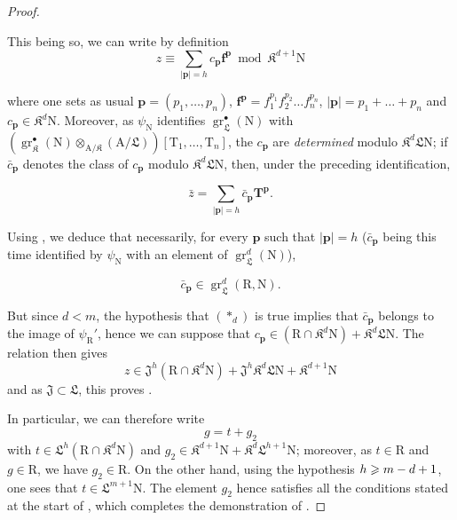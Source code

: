 \begin{proof}
\begin{env}[19.7.1.21]
\label{IV.19.7.1.21}
This being so, we can write by definition
\[
  z\equiv\textstyle\sum_{|\mathbf{p}|=h}c_\mathbf{p}\mathbf{f}^\mathbf{p}\bmod{\mathfrak{K}^{d+1}\mathrm{N}}
\]
\end{env}
where one sets as usual $\mathbf{p}=(p_1,\ldots,p_n)$, $\mathbf{f}^\mathbf{p}=f_1^{p_1}f_2^{p_2}\ldots f_n^{p_n}$, $|\mathbf{p}|=p_1+\ldots+p_n$ and $c_\mathbf{p}\in\mathfrak{K}^d\mathrm{N}$. Moreover, as $\psi_\mathrm{N}$ identifies $\operatorname{gr}_\mathfrak{L}^\bullet(\mathrm{N})$ with $(\operatorname{gr}_\mathfrak{K}^\bullet(\mathrm{N})\otimes_{\mathrm{A}/\mathfrak{K}}(\mathrm{A}/\mathfrak{L}))[\mathrm{T}_1,\ldots,\mathrm{T}_n]$, the $c_\mathbf{p}$ are \emph{determined} modulo $\mathfrak K^d\mathfrak{L}\mathrm{N}$; if $\bar c_\mathbf{p}$ denotes the class of $c_\mathbf{p}$ modulo $\mathfrak K^d\mathfrak{L}\mathrm{N}$, then, under the preceding identification,
\begin{env}[19.7.1.22]
\label{IV.19.7.1.22}
\[
  \bar{z}=\textstyle\sum_{|\mathbf{p}|=h}\bar{c}_\mathbf{p}\mathbf{T}^\mathbf{p}.
\]
\end{env}
Using , we deduce that necessarily, for every $\mathbf{p}$ such that $|\mathbf{p}|=h$ ($\bar{c}_\mathbf{p}$ being this time identified by $\psi_\mathrm{N}$ with an element of $\operatorname{gr}_\mathfrak{L}^d(\mathrm{N})$),
\begin{env}[19.7.1.23]
\label{IV.19.7.1.23}
\[
  \bar{c}_\mathbf{p}\in\operatorname{gr}_\mathfrak{L}^d(\mathrm{R},\mathrm{N}).
\]
\end{env}

But since $d<m$, the hypothesis that $(*_d)$ is true implies that $\bar{c}_\mathbf{p}$ belongs to the image of $\psi_\mathrm{R}'$, hence we can suppose that $c_\mathbf{p}\in(\mathrm{R}\cap\mathfrak{K}^d\mathrm{N})+\mathfrak K^d\mathfrak{L}\mathrm{N}$. The relation  then gives
\[
  z\in\mathfrak{J}^h(\mathrm{R}\cap\mathfrak{K}^d\mathrm{N})+\mathfrak{J}^h\mathfrak{K}^d\mathfrak{L}\mathrm{N}+\mathfrak K^{d+1}\mathrm{N}
\]
and as $\mathfrak{J}\subset\mathfrak{L}$, this proves .

In particular, we can therefore write
\[
  g=t+g_2
\]
with $t\in\mathfrak{L}^h(\mathrm{R}\cap\mathfrak K^d\mathrm{N})$ and $g_2\in\mathfrak K^{d+1}\mathrm{N}+\mathfrak K^d\mathfrak{L}^{h+1}\mathrm{N}$; moreover, as $t\in\mathrm{R}$ and $g\in\mathrm{R}$, we have $g_2\in\mathrm{R}$. On the other hand, using the hypothesis $h\geqslant m- d+1$, one sees that $t\in\mathfrak{L}^{m+1}\mathrm{N}$. The element $g_2$ hence satisfies all the conditions stated at the start of , which completes the demonstration of .
\end{proof}


